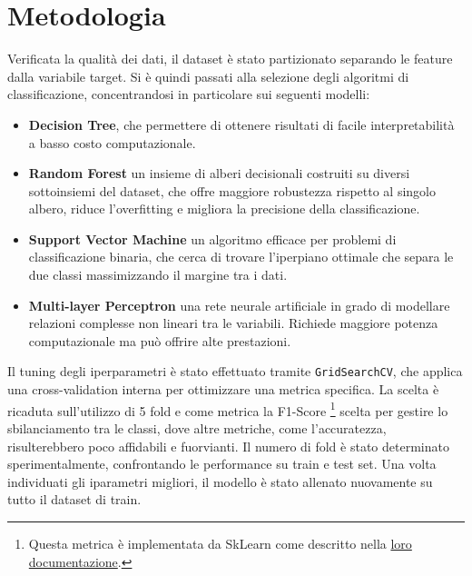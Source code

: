 \documentclass[conference]{IEEEtran}
\begin{document}
\section{Metodologia}
Verificata la qualità dei dati, il dataset è stato partizionato separando le feature dalla variabile target. Si è quindi passati alla selezione degli algoritmi di classificazione, concentrandosi in particolare sui seguenti modelli:
\begin{itemize}
    \item \textbf{Decision Tree}, che permettere di ottenere risultati di facile interpretabilità a basso costo computazionale.
    \item \textbf{Random Forest} un insieme di alberi decisionali costruiti su diversi sottoinsiemi del dataset, che offre maggiore robustezza rispetto al singolo albero, riduce l’overfitting e migliora la precisione della classificazione.
    \item \textbf{Support Vector Machine} un algoritmo efficace per problemi di classificazione binaria, che cerca di trovare l’iperpiano ottimale che separa le due classi massimizzando il margine tra i dati.
    \item \textbf{Multi-layer Perceptron} una rete neurale artificiale in grado di modellare relazioni complesse non lineari tra le variabili. Richiede maggiore potenza computazionale ma può offrire alte prestazioni.
\end{itemize} 

Il tuning degli iperparametri è stato effettuato tramite \texttt{GridSearchCV}, che applica una cross-validation interna per ottimizzare una metrica specifica. La scelta è ricaduta sull'utilizzo di 5 fold e come metrica la F1-Score \footnote{Questa metrica è implementata da SkLearn come descritto nella \href{https://scikit-learn.org/stable/modules/generated/sklearn.metrics.f1_score.html}{loro documentazione}.} scelta per gestire lo sbilanciamento tra le classi, dove altre metriche, come l'accuratezza, risulterebbero poco affidabili e fuorvianti. Il numero di fold è stato determinato sperimentalmente, confrontando le performance su train e test set.
Una volta individuati gli iparametri migliori, il modello è stato allenato nuovamente su tutto il dataset di train.
\end{document}
